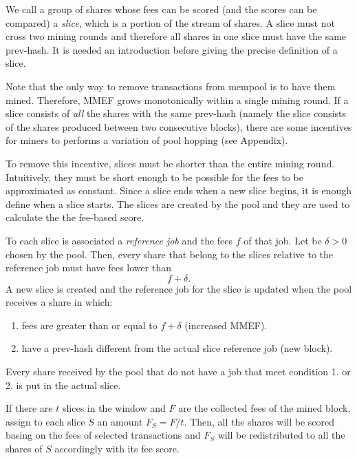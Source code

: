 \documentclass[10pt]{article}
\begin{document}
We call a group of shares whose fees can be scored (and the scores can be compared) a \emph{slice}, which is a portion of the stream of shares. A slice must not cross two mining rounds and therefore all shares in one slice must have the same prev-hash. It is needed an introduction before giving the precise definition of a slice.

Note that the only way to remove transactions from mempool is to have them mined. Therefore, MMEF grows monotonically within a single mining round. If a slice consists of \emph{all} the shares with the same prev-hash (namely the slice consists of the shares produced between two consecutive blocks), there are some incentives for miners to performs a variation of pool hopping (see Appendix).

To remove this incentive, slices must be shorter than the entire mining round. Intuitively, they must be short enough to be possible for the fees to be approximated as constant. Since a slice ends when a new slice begins, it is enough define when a slice starts. The slices are created by the pool and they are used to calculate the the fee-based score.

To each slice is associated a \emph{reference job} and the fees $f$ of that job. Let be $\delta>0$ chosen by the pool. Then, every share that belong to the slices relative to the reference job must have fees lower than
\[ f+\delta.\]
A new slice is created and the reference job for the slice is updated when the pool receives a share in which:
\begin{enumerate}
	\item fees are greater than or equal to $f+\delta$ (increased MMEF).
	\item have a prev-hash different from the actual slice reference job (new block).
\end{enumerate}
Every share received by the pool that do not have a job that meet condition 1. or 2. is put in the actual slice.

If there are $t$ slices in the window and $F$ are the collected fees of the mined block, assign to each slice $S$ an amount $F_S = F/t$. Then, all the shares will be scored basing on the fees of selected transactions and $F_S$ will be redistributed to all the shares of $S$ accordingly with its fee score.
\end{document}

